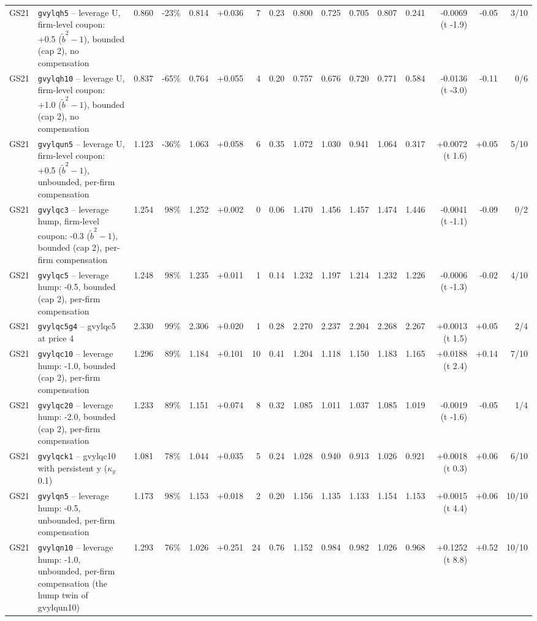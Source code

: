 \begin{landscape}
\begin{longtable}{lp{4.6cm}rrrrrrrrrrrrrr}
GS21 & \texttt{gvylqh5} -- leverage U, firm-level coupon: +0.5 ($\tilde b^2 - 1$), bounded (cap 2), no compensation & 0.860 & -23\% & 0.814 & +0.036 & 7 & 0.23 & 0.800 & 0.725 & 0.705 & 0.807 & 0.241 & -0.0069 (t -1.9) & -0.05 & 3/10 \\
GS21 & \texttt{gvylqh10} -- leverage U, firm-level coupon: +1.0 ($\tilde b^2 - 1$), bounded (cap 2), no compensation & 0.837 & -65\% & 0.764 & +0.055 & 4 & 0.20 & 0.757 & 0.676 & 0.720 & 0.771 & 0.584 & -0.0136 (t -3.0) & -0.11 & 0/6 \\
GS21 & \texttt{gvylqun5} -- leverage U, firm-level coupon: +0.5 ($\tilde b^2 - 1$), unbounded, per-firm compensation & 1.123 & -36\% & 1.063 & +0.058 & 6 & 0.35 & 1.072 & 1.030 & 0.941 & 1.064 & 0.317 & +0.0072 (t 1.6) & +0.05 & 5/10 \\
GS21 & \texttt{gvylqc3} -- leverage hump, firm-level coupon: -0.3 ($\tilde b^2 - 1$), bounded (cap 2), per-firm compensation & 1.254 & 98\% & 1.252 & +0.002 & 0 & 0.06 & 1.470 & 1.456 & 1.457 & 1.474 & 1.446 & -0.0041 (t -1.1) & -0.09 & 0/2 \\
GS21 & \texttt{gvylqc5} -- leverage hump: -0.5, bounded (cap 2), per-firm compensation & 1.248 & 98\% & 1.235 & +0.011 & 1 & 0.14 & 1.232 & 1.197 & 1.214 & 1.232 & 1.226 & -0.0006 (t -1.3) & -0.02 & 4/10 \\
GS21 & \texttt{gvylqc5g4} -- gvylqc5 at price 4 & 2.330 & 99\% & 2.306 & +0.020 & 1 & 0.28 & 2.270 & 2.237 & 2.204 & 2.268 & 2.267 & +0.0013 (t 1.5) & +0.05 & 2/4 \\
GS21 & \texttt{gvylqc10} -- leverage hump: -1.0, bounded (cap 2), per-firm compensation & 1.296 & 89\% & 1.184 & +0.101 & 10 & 0.41 & 1.204 & 1.118 & 1.150 & 1.183 & 1.165 & +0.0188 (t 2.4) & +0.14 & 7/10 \\
GS21 & \texttt{gvylqc20} -- leverage hump: -2.0, bounded (cap 2), per-firm compensation & 1.233 & 89\% & 1.151 & +0.074 & 8 & 0.32 & 1.085 & 1.011 & 1.037 & 1.085 & 1.019 & -0.0019 (t -1.6) & -0.05 & 1/4 \\
GS21 & \texttt{gvylqck1} -- gvylqc10 with persistent y ($\kappa_y$ 0.1) & 1.081 & 78\% & 1.044 & +0.035 & 5 & 0.24 & 1.028 & 0.940 & 0.913 & 1.026 & 0.921 & +0.0018 (t 0.3) & +0.06 & 6/10 \\
GS21 & \texttt{gvylqn5} -- leverage hump: -0.5, unbounded, per-firm compensation & 1.173 & 98\% & 1.153 & +0.018 & 2 & 0.20 & 1.156 & 1.135 & 1.133 & 1.154 & 1.153 & +0.0015 (t 4.4) & +0.06 & 10/10 \\
GS21 & \texttt{gvylqn10} -- leverage hump: -1.0, unbounded, per-firm compensation (the hump twin of gvylqun10) & 1.293 & 76\% & 1.026 & +0.251 & 24 & 0.76 & 1.152 & 0.984 & 0.982 & 1.026 & 0.968 & +0.1252 (t 8.8) & +0.52 & 10/10 \\

\end{longtable}
\end{landscape}
